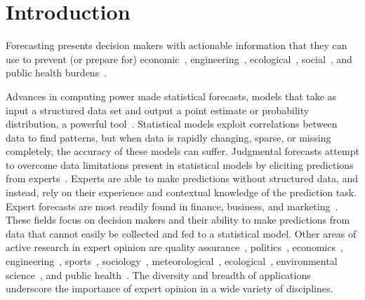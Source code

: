 \documentclass[preprint,authoryear]{elsarticle}
\begin{document}
\section{Introduction}

Forecasting presents decision makers with actionable information that they can use to prevent (or prepare for) economic~\citep{shin2013robust,huang2016improving,mak1996aggregating}, engineering~\cite{guangliang1996multi,zio1996use,neves2008life}, ecological~\cite{borsuk2004predictive,failing2004using,morales2017characterization,johnson2018making}, social~\cite{cabello2012combination,klas2010support,craig2001bayesian}, and public health burdens~\cite{evans1994use,alho1992estimating}.

Advances in computing power made statistical forecasts, models that take as input a structured data set and output a point estimate or probability distribution, a powerful tool~\citep{wang2016statistical,kune2016anatomy,al2015efficient}. 
Statistical models exploit correlations between data to find patterns, but when data is rapidly changing, sparse, or missing completely, the accuracy of these models can suffer. 
Judgmental forecasts attempt to overcome data limitations present in statistical models by eliciting predictions from experts~\citep{clemen1986combining,clemen1989combining,genest1986combining}.
Experts are able to make predictions without structured data, and instead, rely on their experience and contextual knowledge of the prediction task.
Expert forecasts are most readily found in finance, business, and marketing~\citep{seifert2013relative,shin2013robust,franses2011averaging,petrovic2006fuzzy,alvarado2017expertise,song2013combining,baecke2017investigating,baecke2017investigating,petrovic2006fuzzy,franses2011averaging,song2013combining,alvarado2017expertise,seifert2013relative,kabak2008aggregating}.
These fields focus on decision makers and their ability to make predictions from data that cannot easily be collected and fed to a statistical model.
Other areas of active research in expert opinion are quality assurance~\citep{klas2010support}, politics~\cite{hanea2018value,graefe2014accuracy,graefe2015accuracy,graefe2018predicting,cai2016simple,wang2018bayesian,satopaa2014probability,graefe2014combining}, economics~\cite{shin2013robust,huang2016improving,mak1996aggregating}, engineering~\cite{craig2001bayesian,tartakovsky2007probabilistic,neves2008life,ZIO1996127,BRITO201655,jin2007research,wang2008probabilistic,brito2012behavioral,hathout2016uncertainty,ren2002optimal}, sports~\cite{gu2016expert}, sociology~\cite{cabello2012combination,adams2009acceptability}, meteorological~\cite{abramson1996hailfinder}, ecological~\cite{johnson2018making,borsuk2004predictive,failing2004using,cooke2014out}, environmental science~\cite{morales2017characterization,mantyka2014understanding,li2012preliminary,zio1997accounting}, and public health~\cite{alho1992estimating,EVANS199415,jana2019interval,kurowicka2010probabilistic}.
The diversity and breadth of applications underscore the importance of expert opinion in a wide variety of disciplines.
\end{document}
